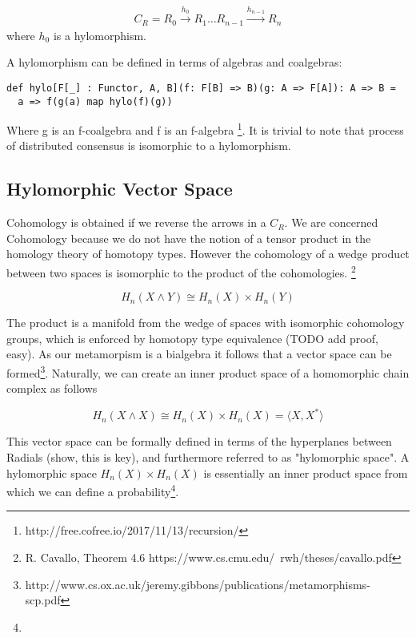\documentclass{article}
\begin{document}
\begin{equation} \label{eq1}
\begin{split}
C_R = R_{0}{\xrightarrow {h_{0}}}R_{1} \dots R_{n-1}{\xrightarrow {h_{n-1}}}R_{n}
\end{split}
\end{equation}
where $h_{0}$ is a hylomorphism.

A hylomorphism can be defined in terms of algebras and coalgebras:
\begin{lstlisting}
def hylo[F[_] : Functor, A, B](f: F[B] => B)(g: A => F[A]): A => B =
  a => f(g(a) map hylo(f)(g))
\end{lstlisting}
Where g is an f-coalgebra and f is an f-algebra \footnote{http://free.cofree.io/2017/11/13/recursion/}. It is trivial to note that process of distributed consensus is isomorphic to a hylomorphism. 

\subsection{Hylomorphic Vector Space}
Cohomology is obtained if we reverse the arrows in a $C_R$. We are concerned Cohomology because we do not have the notion of a tensor product in the homology theory of homotopy types. However the cohomology of a wedge product between two spaces is isomorphic to the product of the cohomologies. \footnote{R. Cavallo, Theorem 4.6 https://www.cs.cmu.edu/~rwh/theses/cavallo.pdf}

\begin{equation} \label{eq1}
H_n(X \wedge Y) \cong H_n(X) \times H_n(Y)
\end{equation}

The product is a manifold from the wedge of spaces with isomorphic cohomology groups, which is enforced by homotopy type equivalence (TODO add proof, easy). As our metamorpism is a bialgebra it follows that a vector space can be formed\footnote{http://www.cs.ox.ac.uk/jeremy.gibbons/publications/metamorphisms-scp.pdf}. Naturally, we can create an inner product space of a homomorphic chain complex as follows

\begin{equation} \label{eq1}
H_n(X \wedge X) \cong H_n(X) \times H_n(X) = \langle X, X^* \rangle
\end{equation}

This vector space can be formally defined in terms of the hyperplanes between Radials (show, this is key), and furthermore referred to as "hylomorphic space". A hylomorphic space $H_n(X) \times H_n(X)$ is essentially an inner product space from which we can define a probability\footnote{}.
\end{document}

